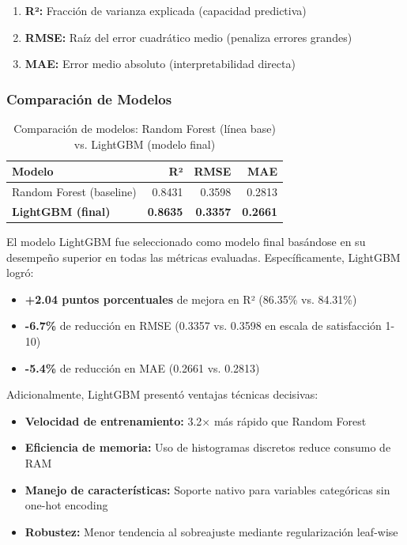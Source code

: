 \begin{enumerate}
    \item \textbf{R²:} Fracción de varianza explicada (capacidad predictiva)
    \item \textbf{RMSE:} Raíz del error cuadrático medio (penaliza errores grandes)
    \item \textbf{MAE:} Error medio absoluto (interpretabilidad directa)
\end{enumerate}

\subsubsection{Comparación de Modelos}

\begin{table}[H]
\centering
\caption{Comparación de modelos: Random Forest (línea base) vs. LightGBM (modelo final)}
\begin{tabular}{@{}lrrr@{}}
\toprule
\textbf{Modelo} & \textbf{R²} & \textbf{RMSE} & \textbf{MAE} \\
\midrule
Random Forest (baseline) & 0.8431 & 0.3598 & 0.2813 \\
\textbf{LightGBM (final)} & \textbf{0.8635} & \textbf{0.3357} & \textbf{0.2661} \\
\bottomrule
\end{tabular}
\label{tab:comparacion_modelos}
\end{table}

El modelo LightGBM fue seleccionado como modelo final basándose en su desempeño superior en todas las métricas evaluadas. Específicamente, LightGBM logró:

\begin{itemize}
    \item \textbf{+2.04 puntos porcentuales} de mejora en R² (86.35\% vs. 84.31\%)
    \item \textbf{-6.7\%} de reducción en RMSE (0.3357 vs. 0.3598 en escala de satisfacción 1-10)
    \item \textbf{-5.4\%} de reducción en MAE (0.2661 vs. 0.2813)
\end{itemize}

Adicionalmente, LightGBM presentó ventajas técnicas decisivas:

\begin{itemize}
    \item \textbf{Velocidad de entrenamiento:} 3.2× más rápido que Random Forest
    \item \textbf{Eficiencia de memoria:} Uso de histogramas discretos reduce consumo de RAM
    \item \textbf{Manejo de características:} Soporte nativo para variables categóricas sin one-hot encoding
    \item \textbf{Robustez:} Menor tendencia al sobreajuste mediante regularización leaf-wise
\end{itemize}

